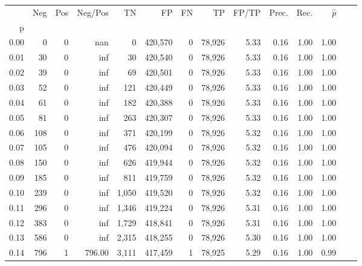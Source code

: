 \begin{tabular}{rrrrrrrrrrrrrr}
\toprule
{} &     Neg &    Pos & Neg/Pos &       TN &       FP &      FN &      TP & FP/TP & Prec. &  Rec. & $\hat{p}$ \\
p    &         &        &         &          &          &         &         &       &       &       &           \\
\midrule
0.00 &       0 &      0 &     nan &        0 &  420,570 &       0 &  78,926 &  5.33 &  0.16 &  1.00 &      1.00 \\
0.01 &      30 &      0 &     inf &       30 &  420,540 &       0 &  78,926 &  5.33 &  0.16 &  1.00 &      1.00 \\
0.02 &      39 &      0 &     inf &       69 &  420,501 &       0 &  78,926 &  5.33 &  0.16 &  1.00 &      1.00 \\
0.03 &      52 &      0 &     inf &      121 &  420,449 &       0 &  78,926 &  5.33 &  0.16 &  1.00 &      1.00 \\
0.04 &      61 &      0 &     inf &      182 &  420,388 &       0 &  78,926 &  5.33 &  0.16 &  1.00 &      1.00 \\
0.05 &      81 &      0 &     inf &      263 &  420,307 &       0 &  78,926 &  5.33 &  0.16 &  1.00 &      1.00 \\
0.06 &     108 &      0 &     inf &      371 &  420,199 &       0 &  78,926 &  5.32 &  0.16 &  1.00 &      1.00 \\
0.07 &     105 &      0 &     inf &      476 &  420,094 &       0 &  78,926 &  5.32 &  0.16 &  1.00 &      1.00 \\
0.08 &     150 &      0 &     inf &      626 &  419,944 &       0 &  78,926 &  5.32 &  0.16 &  1.00 &      1.00 \\
0.09 &     185 &      0 &     inf &      811 &  419,759 &       0 &  78,926 &  5.32 &  0.16 &  1.00 &      1.00 \\
0.10 &     239 &      0 &     inf &    1,050 &  419,520 &       0 &  78,926 &  5.32 &  0.16 &  1.00 &      1.00 \\
0.11 &     296 &      0 &     inf &    1,346 &  419,224 &       0 &  78,926 &  5.31 &  0.16 &  1.00 &      1.00 \\
0.12 &     383 &      0 &     inf &    1,729 &  418,841 &       0 &  78,926 &  5.31 &  0.16 &  1.00 &      1.00 \\
0.13 &     586 &      0 &     inf &    2,315 &  418,255 &       0 &  78,926 &  5.30 &  0.16 &  1.00 &      1.00 \\
0.14 &     796 &      1 &  796.00 &    3,111 &  417,459 &       1 &  78,925 &  5.29 &  0.16 &  1.00 &      0.99 \\

\end{tabular}
